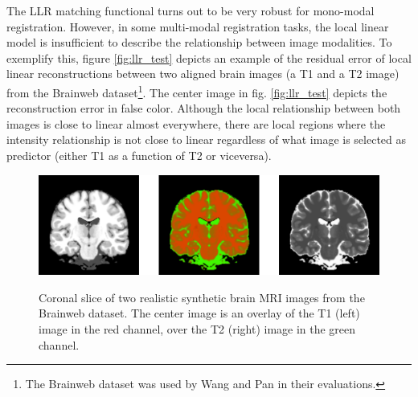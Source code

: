The LLR matching functional turns out to be very robust for mono-modal registration. However, in some multi-modal registration tasks, the local linear model is insufficient to describe the relationship between image modalities. To exemplify this, figure \ref{fig:llr_test} depicts an example of the residual error of local linear reconstructions between two aligned brain images (a T1 and a T2 image) from the Brainweb \cite{Cocosco1997} dataset\footnote{The Brainweb dataset was used by Wang and Pan \cite{Wang2014} in their evaluations.}. The center image in fig. \ref{fig:llr_test} depicts the reconstruction error in false color. Although the local relationship between both images is close to linear almost everywhere, there are local regions where the intensity relationship is not close to linear regardless of what image is selected as predictor (either T1 as a function of T2 or viceversa).\\

\begin{figure}[t!]
\centering
    \includegraphics[width=1.0\linewidth]{./images/brainweb_t1_t2_overlay.png}\\
    \caption{Coronal slice of two realistic synthetic brain MRI images from the Brainweb \cite{Cocosco1997} dataset. The center image is an overlay of the T1 (left) image in the red channel, over the T2 (right) image in the green channel.}
\label{fig:brainweb_t1_t2}
\end{figure}

